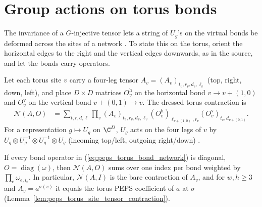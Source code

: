 \section{Group actions on torus bonds}%
\label{sec:peps_torus_bond_actions}

The invariance of a $G$-injective tensor lets a string of $U_g$'s on the
virtual bonds be deformed across the sites of a network
\cite[Section~``Two dimensions: $G$-injective PEPS'']{Schuch2010PEPS}. To
state this on the torus, orient the horizontal edges to the right and the
vertical edges downwards, as in the source, and let the bonds carry
operators.

\begin{definition}%
    \label{def:peps_torus_bond_network}
    \leanok
    Let each torus site $v$ carry a four-leg tensor $A_v=(A_v)_{t_v,r_v,d_v,\ell_v}$ (top, right, down, left), and place $D\times D$ matrices $O^{\mathrm h}_v$ on the horizontal bond $v\to v+(1,0)$ and $O^{\mathrm v}_v$ on the vertical bond $v+(0,1)\to v$. The dressed torus contraction is
    \begin{align}
        \mathcal N(A,O)
         & =\sum_{t,r,d,\ell}\prod_v(A_v)_{t_v,r_v,d_v,\ell_v}
        (O^{\mathrm h}_v)_{\ell_{v+(1,0)},r_v}
        (O^{\mathrm v}_v)_{t_v,d_{v+(0,1)}}.
        \label{eq:peps_torus_bond_network}
    \end{align}
    For a representation $g\mapsto U_g$ on $\C^D$, $U_g$ acts on the four legs of $v$ by $U_g\otimes U_g^{-1}\otimes U_g^{-1}\otimes U_g$ (incoming top/left, outgoing right/down) \cite[Section~``Two dimensions: $G$-injective PEPS'']{Schuch2010PEPS}.
\end{definition}

\begin{lemma}%
    \label{lem:peps_torus_bond_network_diagonal}
    \leanok
    If every bond operator in (\ref{eq:peps_torus_bond_network}) is diagonal, $O=\operatorname{diag}(\omega)$, then $\mathcal N(A,O)$ sums over one index per bond weighted by $\prod_e\omega_{e,i_e}$. In particular, $\mathcal N(A,I)$ is the bare contraction of $A_v$, and for $w,h\ge3$ and $A_v=a^{\sigma(v)}$ it equals the torus PEPS coefficient of $a$ at $\sigma$ (Lemma~\ref{lem:peps_torus_site_tensor_contraction}).
\end{lemma}

